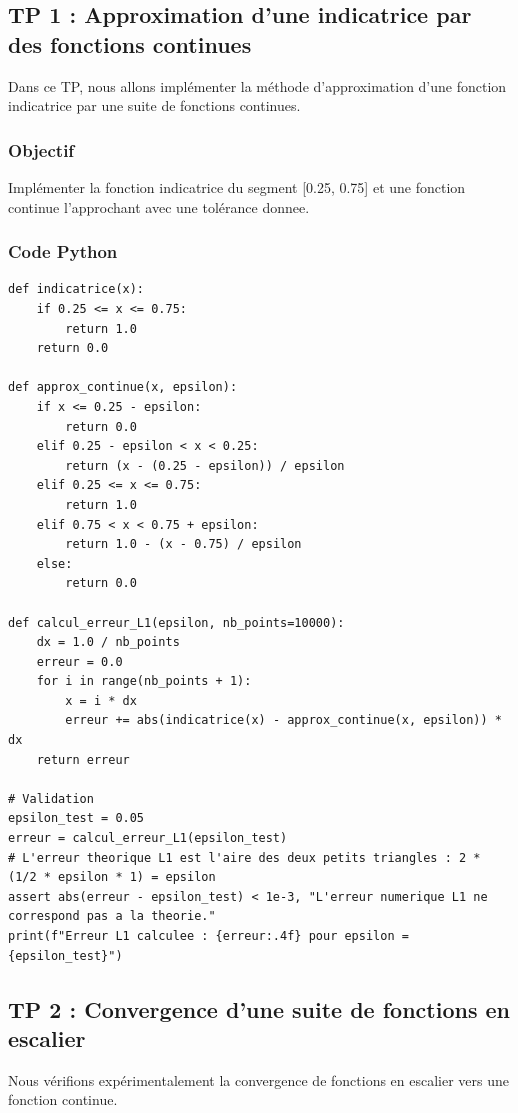 \documentclass[11pt,a4paper]{article}
\begin{document}
\subsection*{TP 1 : Approximation d'une indicatrice par des fonctions continues}

Dans ce TP, nous allons implémenter la méthode d'approximation d'une fonction indicatrice par une suite de fonctions continues.

\subsubsection*{Objectif}
Implémenter la fonction indicatrice du segment [0.25, 0.75] et une fonction continue l'approchant avec une tolérance donnee.

\subsubsection*{Code Python}

\begin{lstlisting}
def indicatrice(x):
    if 0.25 <= x <= 0.75:
        return 1.0
    return 0.0

def approx_continue(x, epsilon):
    if x <= 0.25 - epsilon:
        return 0.0
    elif 0.25 - epsilon < x < 0.25:
        return (x - (0.25 - epsilon)) / epsilon
    elif 0.25 <= x <= 0.75:
        return 1.0
    elif 0.75 < x < 0.75 + epsilon:
        return 1.0 - (x - 0.75) / epsilon
    else:
        return 0.0

def calcul_erreur_L1(epsilon, nb_points=10000):
    dx = 1.0 / nb_points
    erreur = 0.0
    for i in range(nb_points + 1):
        x = i * dx
        erreur += abs(indicatrice(x) - approx_continue(x, epsilon)) * dx
    return erreur

# Validation
epsilon_test = 0.05
erreur = calcul_erreur_L1(epsilon_test)
# L'erreur theorique L1 est l'aire des deux petits triangles : 2 * (1/2 * epsilon * 1) = epsilon
assert abs(erreur - epsilon_test) < 1e-3, "L'erreur numerique L1 ne correspond pas a la theorie."
print(f"Erreur L1 calculee : {erreur:.4f} pour epsilon = {epsilon_test}")
\end{lstlisting}


\subsection*{TP 2 : Convergence d'une suite de fonctions en escalier}

Nous vérifions expérimentalement la convergence de fonctions en escalier vers une fonction continue.
\end{document}
